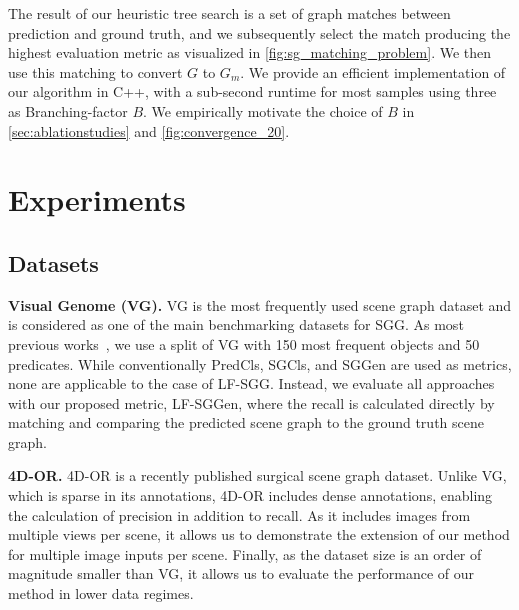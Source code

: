 \documentclass[10pt,twocolumn,letterpaper]{article}
\begin{document}
The result of our heuristic tree search is a set of graph matches between prediction and ground truth, and we subsequently select the match producing the highest evaluation metric as visualized in \cref{fig:sg_matching_problem}. We then use this matching to convert $G$ to $G_{m}$. We provide an efficient implementation of our algorithm in C++, with a sub-second runtime for most samples using three as Branching-factor $B$. We empirically motivate the choice of $B$ in \cref{sec:ablationstudies} and \cref{fig:convergence_20}. 

 

\section{Experiments} \subsection{Datasets}
\noindent\textbf{Visual Genome (VG).} VG is the most frequently used scene graph dataset and is considered as one of the main benchmarking datasets for SGG. As most previous works~\cite{teng_structured_2022}, we use a split of VG with 150 most frequent objects and 50 predicates. While conventionally PredCls, SGCls, and SGGen are used as metrics, none are applicable to the case of LF-SGG. Instead, we evaluate all approaches with our proposed metric, LF-SGGen, where the recall is calculated directly by matching and comparing the predicted scene graph to the ground truth scene graph.

\noindent\textbf{4D-OR.} 4D-OR is a recently published surgical scene graph dataset. Unlike VG, which is sparse in its annotations, 4D-OR includes dense annotations, enabling the calculation of precision in addition to recall. As it includes images from multiple views per scene, it allows us to demonstrate the extension of our method for multiple image inputs per scene. Finally, as the dataset size is an order of magnitude smaller than VG, it allows us to evaluate the performance of our method in lower data regimes. 
\end{document}

